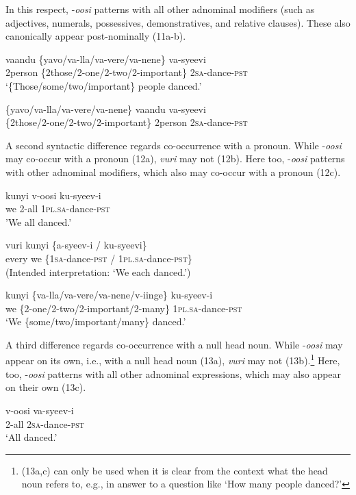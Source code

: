 \documentclass[output=paper]{langsci/langscibook}
\begin{document}
In this respect, -\textit{oosi} patterns with all other adnominal modifiers (such as adjectives, numerals, possessives, demonstratives, and relative clauses). These also canonically appear post-nominally (11a-b). 

\ea
\gll vaandu  \{yavo/va-lla/va-vere/va-nene\}    va-syeevi  \\
     2person  \{2those/2-one/2-two/2-important\} 2\textsc{sa}{}-dance-\textsc{pst}\\
\glt ‘\{Those/some/two/important\} people danced.’
\z

\ea
\gll *\{yavo/va-lla/va-vere/va-nene\}  vaandu   va-syeevi\\
     \{2those/2-one/2-two/2-important\}  2person  2\textsc{sa}{}-dance-\textsc{pst}\\
\z

  A second syntactic difference regards co-occurrence with a pronoun. While -\textit{oosi} may co-occur with a pronoun (12a), \textit{vuri} may not (12b). Here too, -\textit{oosi} patterns with other adnominal modifiers, which also may co-occur with a pronoun (12c).

\ea
\gll kunyi  v-oosi    ku-syeev-i      \\
     we  2-all    1\textsc{pl}.\textsc{sa}{}-dance-\textsc{pst}\\
\glt 'We all danced.'
\z

\ea
\gll *vuri  kunyi    \{a-syeev-i / ku-syeevi\}  \\
     every  we    \{1\textsc{sa}{}-dance-\textsc{pst /} 1\textsc{pl}.\textsc{sa}{}-dance-\textsc{pst\}}\\
\glt (Intended interpretation: ‘We each danced.’)
\z

\ea
\gll kunyi \{va-lla/va-vere/va-nene/v-iinge\}     ku-syeev-i\\
     we    \{2-one/2-two/2-important/2-many\} 1\textsc{pl}.\textsc{sa}{}-dance-\textsc{pst}\\
\glt ‘We \{some/two/important/many\} danced.’
\z

  A third difference regards co-occurrence with a null head noun. While -\textit{oosi} may appear on its own, i.e., with a null head noun (13a), \textit{vuri} may not (13b).\footnote{ (13a,c) can only be used when it is clear from the context what the head noun refers to, e.g., in answer to a question like ‘How many people danced?’
} Here, too, -\textit{oosi} patterns with all other adnominal expressions, which may also appear on their own (13c).

\ea
\gll v-oosi    va-syeev-i      \\
     2-all    2\textsc{sa}{}-dance-\textsc{pst}\\
\glt ‘All danced.’
\z
\end{document}
